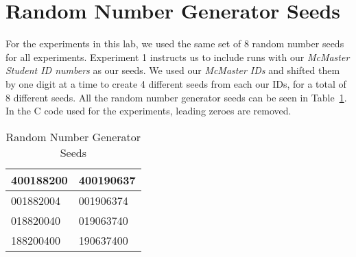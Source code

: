 \section*{Random Number Generator Seeds}
For the experiments in this lab, we used the same set of 8 random number seeds for all experiments. Experiment 1 instructs us to include runs with our \textit{McMaster Student ID numbers} as our seeds. We used our \textit{McMaster IDs} and shifted them by one digit at a time to create 4 different seeds from each our IDs, for a total of 8 different seeds. All the random number generator seeds can be seen in Table~\ref{tab:random_seeds}. In the C code used for the experiments, leading zeroes are removed.

\begin{table}[h]
	\centering
	\begin{tabular}{|l|l|}
	\hline
	400188200 & 400190637 \\ \hline
	001882004 & 001906374 \\ \hline
	018820040 & 019063740 \\ \hline
	188200400 & 190637400 \\ \hline
	\end{tabular}
\caption{Random Number Generator Seeds}
\label{tab:random_seeds}
\end{table}